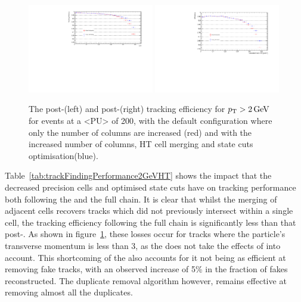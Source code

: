 \begin{figure}[tbp]
\centering
\includegraphics[width=0.49\textwidth]{figs/tk-upgrade/results-lowPtTracking/htTrackingEffVsInvPtFlatGeometry_5000.pdf}
\includegraphics[width=0.49\textwidth]{figs/tk-upgrade/results-lowPtTracking/kfTrackingEffVsInvPtFlatGeometry_5000.pdf}
\caption{The post-\HT (left) and post-\KF (right) tracking efficiency for $p_{\mathrm{T}} > 2\,\text{Ge\hspace{-.08em}V}$ for \ttbar events at a <PU> of 200, with the default configuration where only the number of \qpt columns are increased (red) and with the increased number of columns, HT cell merging and \KF state cuts optimisation(blue).
}
\label{fig:2GeVFlatEff}	
\end{figure}

Table~\ref{tab:trackFindingPerformance2GeVHT} shows the impact that the decreased precision \HT cells and optimised \KF state cuts have on tracking performance both following the \HT and the full chain.
It is clear that whilst the merging of adjacent \HT cells recovers  tracks which did not previously intersect within a single \HT cell, the tracking efficiency following the full chain is significantly less than that post-\HT.
As shown in figure~\ref{fig:2GeVFlatEff}, these losses occur for tracks where the particle's transverse momentum is less than 3\GeV, as the \KF does not take the effects of \MS into account.
This shortcoming of the \KF also accounts for it not being as efficient at removing fake tracks, with an observed increase of 5\% in the fraction of fakes reconstructed.
The duplicate removal algorithm however, remains effective at removing almost all the duplicates.

